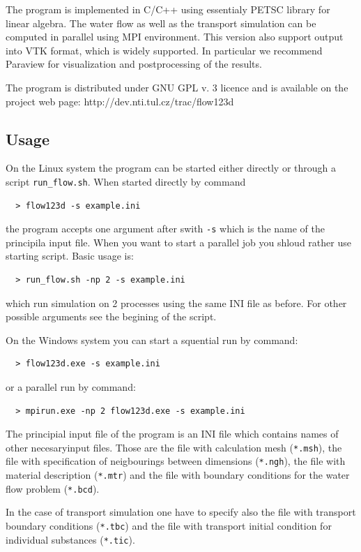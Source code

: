 The program is implemented in C/C++ using essentialy PETSC library for linear algebra. The water flow as well as the transport simulation can be computed 
in parallel using MPI environment. This version also support output into VTK format, which is widely supported. In particular we recommend Paraview for 
visualization and postprocessing of the results.

The program is distributed under GNU GPL v. 3 licence and is available on the project web page:
http://dev.nti.tul.cz/trac/flow123d

\subsection*{Usage}
On the Linux system the program can be started either directly or through a script \verb'run_flow.sh'. When started directly by command
\begin{verbatim}
  > flow123d -s example.ini
\end{verbatim}
the program accepts one argument after swith \verb'-s' which is the name of the principila input file. When you want to start a parallel job
you shloud rather use starting script. Basic usage is:
\begin{verbatim}
  > run_flow.sh -np 2 -s example.ini
\end{verbatim}
which run simulation on 2 processes using the same INI file as before. For other possible arguments see the begining of the script.

On the Windows system you can start a squential run by command:
\begin{verbatim}
  > flow123d.exe -s example.ini
\end{verbatim}
or a parallel run by command:
\begin{verbatim}
  > mpirun.exe -np 2 flow123d.exe -s example.ini
\end{verbatim}



The principial input file of the program is an INI file which contains names of other necesaryinput files.
Those are the file with calculation mesh (\verb'*.msh'), the file with specification of neigbourings between dimensions (\verb'*.ngh'),
the file with material description (\verb'*.mtr') and the file with boundary conditions for the water flow problem (\verb'*.bcd').

In the case of transport simulation one have to specify also the file with transport boundary conditions (\verb'*.tbc') 
and the file with transport initial condition
for individual substances (\verb'*.tic').

